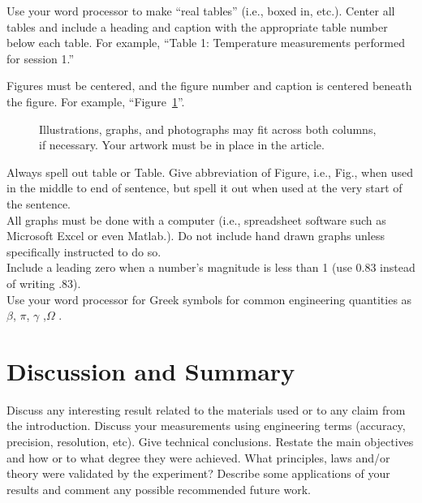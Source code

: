 \documentclass[journal]{IEEEtran}
\begin{document}

Use your word processor to make “real tables” (i.e., boxed in, etc.). Center all tables and include a heading and caption with the appropriate table number below each table. For example, “Table 1: Temperature measurements performed for session 1.” 

Figures must be centered, and the figure number and caption is centered beneath the
figure. For example, “Figure~\ref{fig:ecg}”. 

\begin{figure}[H]%
\begin {center}
\caption{Illustrations, graphs, and photographs may fit across both columns, if necessary. Your artwork must be in place in the article.}
\label{fig:ecg}
\end {center}
\end{figure}

Always spell out table or Table. Give abbreviation of Figure, i.e., Fig., when used in
the middle to end of sentence, but spell it out when used at the very start of the
sentence. \\


All graphs must be done with a computer (i.e., spreadsheet software such as
Microsoft Excel or even Matlab.). Do not include hand drawn graphs unless
specifically instructed to do so.  \\
Include a leading zero when a number’s magnitude is less than 1 (use 0.83 instead of
writing .83). \\
Use your word processor for Greek symbols for common engineering quantities as $\beta$, $\pi$, $\gamma$ ,$\Omega$ . 

\section{Discussion and Summary}
Discuss any interesting result related to the materials used or to any claim from the introduction. Discuss your measurements using engineering terms (accuracy, precision, resolution, etc).  Give technical conclusions. Restate the main objectives and how or to what degree they were achieved. What principles, laws and/or theory
were validated by the experiment? Describe some applications of your results and comment any possible recommended future work.



\end{document}
